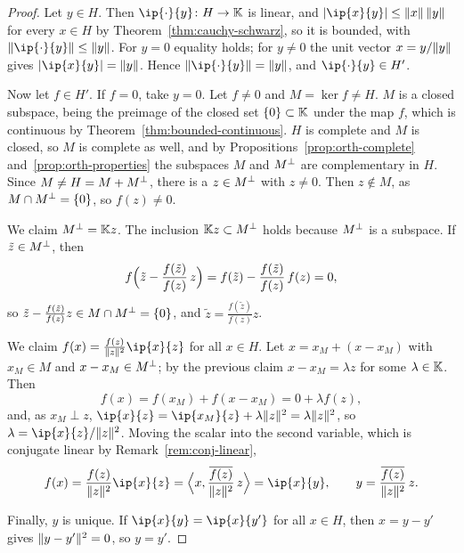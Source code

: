 \begin{proof}
Let $y \in H$. Then $\ip{\cdot}{y} \colon H \to \K$ is linear, and
$\abs{\ip{x}{y}} \le \norm{x}\,\norm{y}$ for every $x \in H$ by
Theorem~\ref{thm:cauchy-schwarz}, so it is bounded, with
$\norm{\ip{\cdot}{y}} \le \norm{y}$. For $y = 0$ equality holds; for
$y \ne 0$ the unit vector $x = y / \lVert y\rVert$ gives
$\abs{\ip{x}{y}} = \norm{y}$. Hence $\norm{\ip{\cdot}{y}} = \norm{y}$, and
$\ip{\cdot}{y} \in H'$.

Now let $f \in H'$. If $f = 0$, take $y = 0$. Let $f \ne 0$ and
$M = \ker f \ne H$. $M$ is a closed subspace, being the preimage of the
closed set $\{0\} \subset \mathbb{K}$ under the map $f$, which is continuous by
Theorem~\ref{thm:bounded-continuous}. $H$ is complete and $M$ is closed, so
$M$ is complete as well, and by Propositions~\ref{prop:orth-complete}
and~\ref{prop:orth-properties} the subspaces $M$ and $M^{\perp}$ are
complementary in $H$. Since $M \ne H = M + M^{\perp}$, there is a
$z \in M^{\perp}$ with $z \ne 0$. Then $z \notin M$, as
$M \cap M^{\perp} = \{0\}$, so $f(z) \ne 0$.

We claim $M^{\perp} = \mathbb{K} z$. The inclusion $\mathbb{K} z \subset M^{\perp}$ holds
because $M^{\perp}$ is a subspace. If $\tilde{z} \in M^{\perp}$, then
\[
  f\Bigl(\tilde{z} - \frac{f(\tilde{z})}{f(z)}\, z\Bigr)
  = f(\tilde{z}) - \frac{f(\tilde{z})}{f(z)}\, f(z) = 0 ,
\]
so $\tilde{z} - \frac{f(\tilde{z})}{f(z)} z \in M \cap M^{\perp} = \{0\}$,
and $\tilde{z} = \frac{f(\tilde{z})}{f(z)} z$.

We claim $f(x) = \frac{f(z)}{\norm{z}^2}\ip{x}{z}$ for all $x \in H$. Let
$x = x_M + (x - x_M)$ with $x_M \in M$ and $x - x_M \in M^{\perp}$; by the
previous claim $x - x_M = \lambda z$ for some $\lambda \in \mathbb{K}$. Then
\[
  f(x) = f(x_M) + f(x - x_M) = 0 + \lambda f(z) ,
\]
and, as $x_M \perp z$,
$\ip{x}{z} = \ip{x_M}{z} + \lambda\norm{z}^2 = \lambda\norm{z}^2$, so
$\lambda = \ip{x}{z} / \norm{z}^2$. Moving the scalar into the second
variable, which is conjugate linear by Remark~\ref{rem:conj-linear},
\[
  f(x) = \frac{f(z)}{\norm{z}^2}\ip{x}{z}
  = \Bigl\langle x, \frac{\overline{f(z)}}{\norm{z}^2}\, z \Bigr\rangle
  = \ip{x}{y}, \qquad y = \frac{\overline{f(z)}}{\norm{z}^2}\, z .
\]

Finally, $y$ is unique. If $\ip{x}{y} = \ip{x}{y'}$ for all $x \in H$, then
$x = y - y'$ gives $\lVert y - y'\rVert^2 = 0$, so $y = y'$.
\end{proof}
